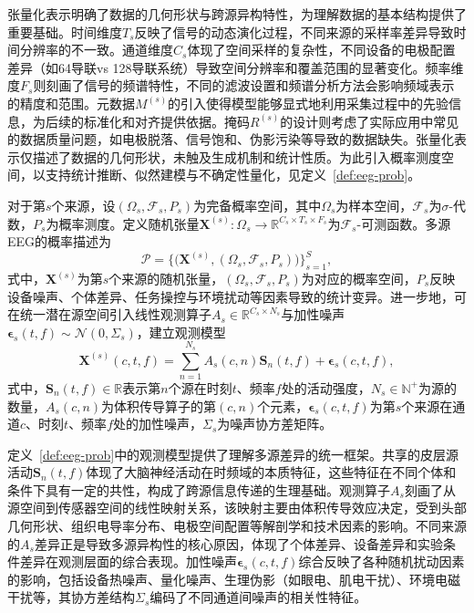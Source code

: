 张量化表示明确了数据的几何形状与跨源异构特性，为理解数据的基本结构提供了重要基础。时间维度$T_s$反映了信号的动态演化过程，不同来源的采样率差异导致时间分辨率的不一致。通道维度$C_s$体现了空间采样的复杂性，不同设备的电极配置差异（如64导联vs 128导联系统）导致空间分辨率和覆盖范围的显著变化。频率维度$F_s$则刻画了信号的频谱特性，不同的滤波设置和频谱分析方法会影响频域表示的精度和范围。元数据$M^{(s)}$的引入使得模型能够显式地利用采集过程中的先验信息，为后续的标准化和对齐提供依据。掩码$R^{(s)}$的设计则考虑了实际应用中常见的数据质量问题，如电极脱落、信号饱和、伪影污染等导致的数据缺失。张量化表示仅描述了数据的几何形状，未触及生成机制和统计性质。为此引入概率测度空间，以支持统计推断、似然建模与不确定性量化，见定义~\ref{def:eeg-prob}。


\begin{definition}[多源EEG的概率空间表述]
\label{def:eeg-prob}
对于第$s$个来源，设$(\Omega_s, \mathcal{F}_s, P_s)$为完备概率空间，其中$\Omega_s$为样本空间，$\mathcal{F}_s$为$\sigma$-代数，$P_s$为概率测度。定义随机张量$\mathbf{X}^{(s)}: \Omega_s \to \mathbb{R}^{C_s \times T_s \times F_s}$为$\mathcal{F}_s$-可测函数。多源EEG的概率描述为
\begin{equation}
\label{eq:prob-collection}
\mathcal{P} = \Big\{ \big(\mathbf{X}^{(s)}, (\Omega_s, \mathcal{F}_s, P_s)\big) \Big\}_{s=1}^{S},
\end{equation}
式中，$\mathbf{X}^{(s)}$为第$s$个来源的随机张量，$(\Omega_s, \mathcal{F}_s, P_s)$为对应的概率空间，$P_s$反映设备噪声、个体差异、任务操控与环境扰动等因素导致的统计变异。进一步地，可在统一潜在源空间引入线性观测算子$A_s \in \mathbb{R}^{C_s \times N_s}$与加性噪声$\boldsymbol{\epsilon}_s(t,f) \sim \mathcal{N}(0, \Sigma_s)$，建立观测模型
\begin{equation}
\label{eq:observation-model}
\mathbf{X}^{(s)}(c,t,f) = \sum_{n=1}^{N_s} A_s(c,n) \mathbf{S}_n(t,f) + \boldsymbol{\epsilon}_s(c,t,f),
\end{equation}
式中，$\mathbf{S}_n(t,f) \in \mathbb{R}$表示第$n$个源在时刻$t$、频率$f$处的活动强度，$N_s \in \mathbb{N}^+$为源的数量，$A_s(c,n)$为体积传导算子的第$(c,n)$个元素，$\boldsymbol{\epsilon}_s(c,t,f)$为第$s$个来源在通道$c$、时刻$t$、频率$f$处的加性噪声，$\Sigma_s$为噪声协方差矩阵。
\end{definition}

定义~\ref{def:eeg-prob}中的观测模型提供了理解多源差异的统一框架。共享的皮层源活动$\mathbf{S}_n(t,f)$体现了大脑神经活动在时频域的本质特征，这些特征在不同个体和条件下具有一定的共性，构成了跨源信息传递的生理基础。观测算子$A_s$刻画了从源空间到传感器空间的线性映射关系，该映射主要由体积传导效应决定，受到头部几何形状、组织电导率分布、电极空间配置等解剖学和技术因素的影响。不同来源的$A_s$差异正是导致多源异构性的核心原因，体现了个体差异、设备差异和实验条件差异在观测层面的综合表现。加性噪声$\boldsymbol{\epsilon}_s(c,t,f)$综合反映了各种随机扰动因素的影响，包括设备热噪声、量化噪声、生理伪影（如眼电、肌电干扰）、环境电磁干扰等，其协方差结构$\Sigma_s$编码了不同通道间噪声的相关性特征。

